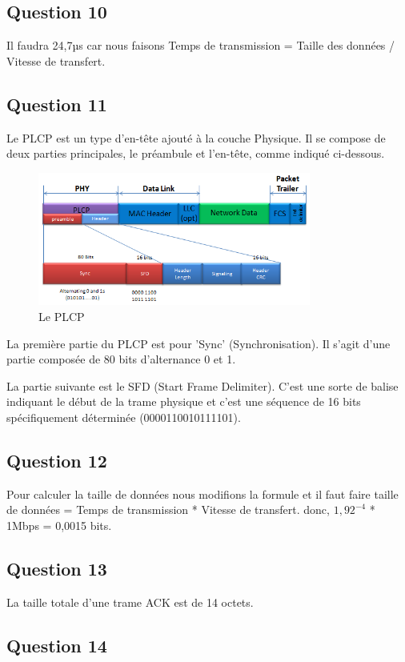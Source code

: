 \documentclass[12pt, a4paper]{article}
\begin{document}
\subsection{Question 10}
Il faudra 24,7µs car nous faisons Temps de transmission = Taille des données / Vitesse de transfert.
\newpage 

\subsection{Question 11}
Le PLCP est un type d'en-tête ajouté à la couche Physique. Il se 
compose de deux parties principales, le préambule et l'en-tête, 
comme indiqué ci-dessous.

\begin{figure}[H]
    \centering
    \includegraphics[width=0.8\textwidth]{img/td.png}
    \caption{Le PLCP}
    \label{fig:td}
\end{figure}

La première partie du PLCP est pour 'Sync' (Synchronisation). Il 
s'agit d'une partie composée de 80 bits d'alternance 0 et 1.

La partie suivante est le SFD (Start Frame Delimiter). C'est 
une sorte de balise indiquant le début de la trame physique et 
c'est une séquence de 16 bits spécifiquement déterminée (0000110010111101).

\subsection{Question 12}
Pour calculer la taille de données nous modifions la formule et il faut faire 
taille de données = Temps de transmission * Vitesse de transfert.
donc, $ 1,92^{-4} $ * 1Mbps = 0,0015 bits. 

\subsection{Question 13}
La taille totale d'une trame ACK est de 14 octets.

\subsection{Question 14}
\end{document}
